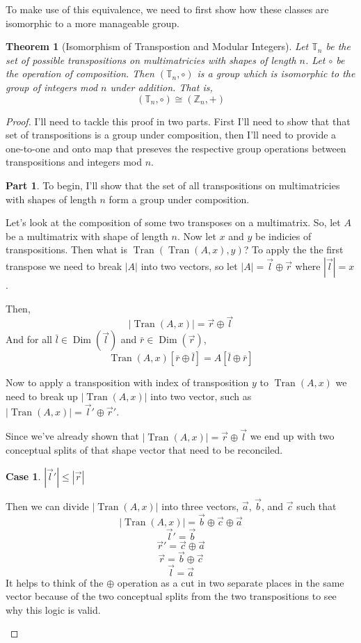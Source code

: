 \documentclass[12pt]{book}
\theoremstyle{plain}
\newtheorem{theorem}{Theorem}[chapter]
\theoremstyle{definition}
\theoremstyle{ppart}
\newtheorem{ppart}{Part}
\theoremstyle{case}
\newtheorem{case}{Case}
\theoremstyle{solution}
\DeclareMathOperator{\Dim}{Dim}
\DeclareMathOperator{\Tran}{Tran}
\begin{document}
To make use of this equivalence, we need to first show how these classes are
isomorphic \cite{book:abstract} to a more manageable group.

\begin{theorem}[Isomorphism of Transpostion and Modular Integers]
\label{tran_int_iso}
Let $\mathbb{T}_n$ be the set of possible transpositions on multimatricies with
shapes of length $n$. Let $\circ$ be the operation of composition. Then
$(\mathbb{T}_n, \circ)$ is a group which is isomorphic to the group of
integers mod $n$ under addition. That is,
\[ (\mathbb{T}_n, \circ) \cong (\mathbb{Z}_n, +) \]
\end{theorem}
\begin{proof}
I'll need to tackle this proof in two parts. First I'll need to show that
that set of transpositions is a group under composition, then I'll need to
provide a one-to-one and onto map that preseves the respective group operations
between transpositions and integers mod $n$.

\begin{ppart}
To begin, I'll show that the set of all transpositions on multimatricies 
with shapes of length $n$ form a group under composition.

Let's look at the composition of some two transposes on a multimatrix.
So, let $A$ be a multimatrix with shape of length $n$. Now let $x$ and $y$
be indicies of transpositions. Then what is $\Tran(\Tran(A, x), y)$?
To apply the the first transpose we need to break $|A|$ into two vectors,
so let $|A| = \vec{l} \oplus \vec{r}$ where $|\vec{l}| = x$.

Then,
\[ |\Tran(A, x)| = \vec{r} \oplus \vec{l} \]
And for all
$\bar{l} \in \Dim(\vec{l})$ and $\bar{r} \in \Dim(\vec{r})$,
\[ \Tran(A, x)[\bar{r} \oplus \bar{l}] = A[\bar{l} \oplus \bar{r}] \]

Now to apply a transposition with index of transposition $y$ to $\Tran(A,x)$
we need to break up $|\Tran(A,x)|$ into two vector, such as
$|\Tran(A,x)| = \vec{l}' \oplus \vec{r}'$.

Since we've already shown that $|\Tran(A,x)| = \vec{r} \oplus \vec{l}$
we end up with two conceptual splits of that shape vector that need to
be reconciled.

\begin{case} $|\vec{l}'| \le |\vec{r}|$

Then we can divide $|\Tran(A,x)|$ into three vectors, $\vec{a}$, $\vec{b}$, and $\vec{c}$
such that
\[ |\Tran(A,x)| = \vec{b} \oplus \vec{c} \oplus \vec{a} \]
\[ \vec{l}' = \vec{b} \]
\[ \vec{r}' = \vec{c} \oplus \vec{a} \]
\[ \vec{r} = \vec{b} \oplus \vec{c} \]
\[ \vec{l} = \vec{a} \]
It helps to think of the $\oplus$ operation as a cut in two separate places in the same
vector because of the two conceptual splits from the two transpositions to see why this
logic is valid.


\end{case}
\end{ppart}
\end{proof}
\end{document}
